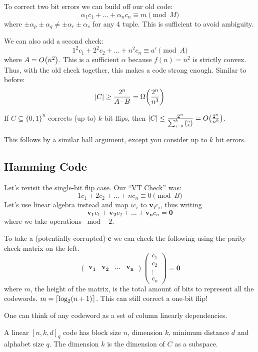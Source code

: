 To correct two bit errors we can build off our old code:
\[ \alpha_1 c_1 + \dots + \alpha_n c_n \equiv m \pmod M \]
where $\pm \alpha_p \pm \alpha_q \neq \pm \alpha_r \pm \alpha_s$ for any 4 tuple. This is sufficient to avoid ambiguity.

We can also add a second check:
\[ 1^2 c_1 + 2^2 c_2 + \dots + n^2 c_n \equiv a' \pmod A \]
where $A = O\qty(n^2)$. This is a sufficient $\alpha$ because $f(n) = n^2$ is strictly convex. Thus, with the old check together, this makes a code strong enough.
Similar to before:
\[ |C| \geq \frac{2^n}{A \cdot B} = \Omega\qty(\frac{2^n}{n^3}) \]

\begin{theorem}
    If $C \subseteq \{0, 1\}^n$ corrects (up to) $k$-bit flips, then $|C| \leq \frac{2^n}{\sum_{i = 0}^{k} \binom{n}{k}} = O\qty(\frac{2^n}{n^k})$.
\end{theorem}

This follows by a similar ball argument, except you consider up to $k$ bit errors.

\subsection{Hamming Code}
Let's revisit the single-bit flip case. Our ``VT Check'' was:
\[ 1c_1 + 2c_2 + \dots + n c_n \equiv 0 \pmod B \]
Let's use linear algebra instead and map $ic_i$ to $\mathbf{v_i} c_i$,
thus writing
\[ \mathbf{v_1} c_1 + \mathbf{v_2} c_2 + \dots + \mathbf{v_n} c_n = \mathbf{0} \]
where we take operations $\bmod \text{ } 2$. 

To take a (potentially corrupted) $\mathbf{c}$ we can check the following using the parity check matrix on the left.
\[ \begin{pmatrix}
    \mathbf{v_1} & \mathbf{v_2} & \dots & \mathbf{v_n}
\end{pmatrix} \begin{pmatrix}
    c_1 \\ c_2 \\ \vdots \\ c_n
\end{pmatrix} = \mathbf{0} \]
where $m$, the height of the matrix, is the total amount of bits to represent all the codewords. $m = \left\lceil \log_2 (n + 1) \right\rceil$. This can still correct a one-bit flip!

One can think of any codeword as a set of column linearly dependencies.

\begin{definition} 
    A linear $[n, k, d]_q$ code has block size $n$, dimension $k$, minimum distance $d$ and alphabet size $q$. The dimension $k$ is the dimension of $C$ as a subspace.
\end{definition}

